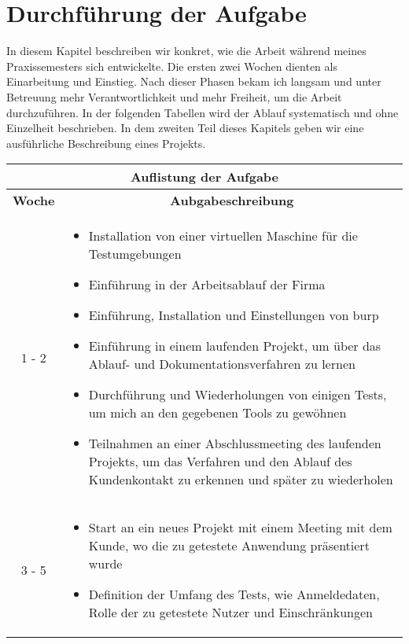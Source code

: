 \section{Durchführung der Aufgabe}

In diesem Kapitel beschreiben wir konkret, wie die Arbeit während meines Praxissemesters sich entwickelte. Die ersten zwei Wochen dienten als Einarbeitung und Einstieg. Nach dieser Phasen bekam ich langsam und unter Betreuung mehr Verantwortlichkeit und mehr Freiheit, um die Arbeit durchzuführen. In der folgenden Tabellen wird der Ablauf systematisch und ohne Einzelheit beschrieben. In dem zweiten Teil dieses Kapitels geben wir eine ausführliche Beschreibung eines Projekts.

\begin{table}[H]
    \begin{tabularx}{\textwidth}{|c|X|}
    \toprule
    \multicolumn{2}{c}{\textbf{Auflistung der Aufgabe}} \\
    \midrule
    \multicolumn{1}{c}{\textbf{Woche}} & \multicolumn{1}{c}{\textbf{Aubgabeschreibung}} \\
    \hline
    1 - 2       & \begin{itemize}
                    \item Installation von einer virtuellen Maschine für die Testumgebungen
                    \item Einführung in der Arbeitsablauf der Firma
                    \item Einführung, Installation und Einstellungen von \gls{burp}
                    \item Einführung in einem laufenden Projekt, um über das Ablauf- und Dokumentationsverfahren zu lernen
                    \item Durchführung und Wiederholungen von einigen Tests, um mich an den gegebenen Tools zu gewöhnen
                    \item Teilnahmen an einer Abschlussmeeting des laufenden Projekts, um das Verfahren und den Ablauf des Kundenkontakt zu erkennen und später zu wiederholen
                \end{itemize} \\
        \hline
    3 - 5       & \begin{itemize}
                    \item Start an ein neues Projekt mit einem Meeting mit dem Kunde, wo die zu getestete Anwendung präsentiert wurde
                    \item Definition der Umfang des Tests, wie Anmeldedaten, Rolle der zu getestete Nutzer und Einschränkungen

\end{itemize}
\end{tabularx}
\end{table}
